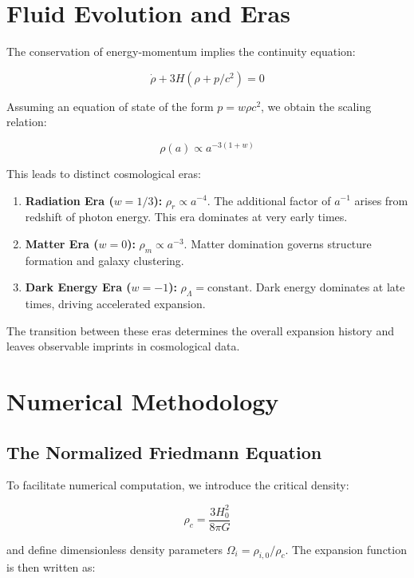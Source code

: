 \documentclass[12pt, a4paper]{article}
\begin{document}
\section{Fluid Evolution and Eras}

The conservation of energy-momentum implies the continuity equation:

\begin{equation}
\dot{\rho} + 3H(\rho + p/c^2) = 0
\end{equation}

Assuming an equation of state of the form $p = w\rho c^2$, we obtain the scaling relation:

\begin{equation}
\rho(a) \propto a^{-3(1+w)}
\end{equation}

This leads to distinct cosmological eras:

\begin{enumerate}
    \item \textbf{Radiation Era ($w=1/3$):} $\rho_r \propto a^{-4}$. The additional factor of $a^{-1}$ arises from redshift of photon energy. This era dominates at very early times.
    
    \item \textbf{Matter Era ($w=0$):} $\rho_m \propto a^{-3}$. Matter domination governs structure formation and galaxy clustering.
    
    \item \textbf{Dark Energy Era ($w=-1$):} $\rho_\Lambda = \text{constant}$. Dark energy dominates at late times, driving accelerated expansion.
\end{enumerate}

The transition between these eras determines the overall expansion history and leaves observable imprints in cosmological data.


\section{Numerical Methodology}

\subsection{The Normalized Friedmann Equation}

To facilitate numerical computation, we introduce the critical density:

\[
\rho_c = \frac{3H_0^2}{8\pi G}
\]

and define dimensionless density parameters $\Omega_i = \rho_{i,0}/\rho_c$. The expansion function is then written as:
\end{document}
